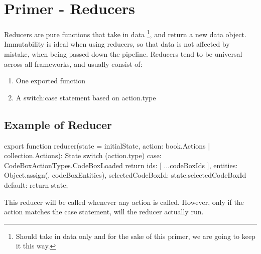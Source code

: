 \maketitle{}
\section{ Primer - Reducers }
Reducers are pure functions that take in data \footnote{Should take in data only
and for the sake of this primer, we are going to keep it this way.}, and return
a new data object. Immutability is ideal when using reducers, so that data is
not affected by mistake, when being passed down the pipeline. Reducers tend to
be universal across all frameworks, and usually consist of:
\begin{enumerate}
  \item One exported function
  \item A switch:case statement based on action.type
\end{enumerate}

\subsection{ Example of Reducer }
export function reducer(state = initialState, action: book.Actions
| collection.Actions): State {
  switch (action.type) {
    case: CodeBoxActionTypes.CodeBoxLoaded {
      return {
        ids: [ ...codeBoxIds ],
        entities: Object.assign({}, codeBoxEntities),
        selectedCodeBoxId: state.selectedCodeBoxId
      }
    }
    default: {
      return state;
    }
  }
}

This reducer will be called whenever any action is called. However, only if
the action matches the case statement, will the reducer actually run.
